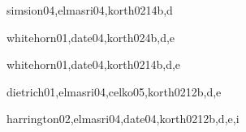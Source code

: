 \begin{syllabus}
\begin{unit}{\IMDataModelingDef}{}{simsion04,elmasri04,korth02}{14}{b,d}
    \IMDataModelingAllTopics
    \IMDataModelingAllObjectives
\end{unit}

\begin{unit}{\IMIndexingDef}{}{whitehorn01,date04,korth02}{4}{b,d,e}
    \IMIndexingAllTopics
    \IMIndexingAllObjectives
\end{unit}

\begin{unit}{\IMRelationalDatabasesDef}{}{whitehorn01,date04,korth02}{14}{b,d,e}
    \IMRelationalDatabasesAllTopics
    \IMRelationalDatabasesAllObjectives
\end{unit}

\begin{unit}{\IMQueryLanguagesDef}{}{dietrich01,elmasri04,celko05,korth02}{12}{b,d,e}
    \IMQueryLanguagesAllTopics
    \IMQueryLanguagesAllObjectives
\end{unit}

\begin{unit}{\IMRelationalDatabasesDesignDef}{}{harrington02,elmasri04,date04,korth02}{12}{b,d,e,i}
    \IMRelationalDatabasesDesignAllTopics
    \IMRelationalDatabasesDesignAllObjectives
\end{unit}


\begin{coursebibliography}
\end{coursebibliography}

\end{syllabus}

%
